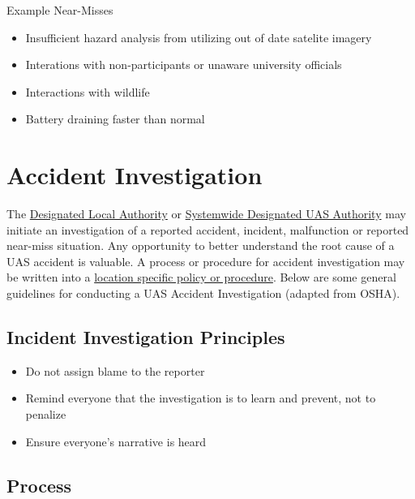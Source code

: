 \documentclass[
]{book}
\providecommand{\tightlist}{%
  \setlength{\itemsep}{0pt}\setlength{\parskip}{0pt}}
\begin{document}
Example Near-Misses

\begin{itemize}
\tightlist
\item
  Insufficient hazard analysis from utilizing out of date satelite imagery
\item
  Interations with non-participants or unaware university officials
\item
  Interactions with wildlife
\item
  Battery draining faster than normal
\end{itemize}

\hypertarget{s-investigation}{%
\section{Accident Investigation}\label{s-investigation}}

The \protect\hyperlink{DLA}{Designated Local Authority} or \protect\hyperlink{SDA}{Systemwide Designated UAS Authority} may initiate an investigation of a reported accident, incident, malfunction or reported near-miss situation. Any opportunity to better understand the root cause of a UAS accident is valuable. A process or procedure for accident investigation may be written into a \protect\hyperlink{LSP}{location specific policy or procedure}. Below are some general guidelines for conducting a UAS Accident Investigation (adapted from OSHA).

\hypertarget{incident-investigation-principles}{%
\subsection{Incident Investigation Principles}\label{incident-investigation-principles}}

\begin{itemize}
\tightlist
\item
  Do not assign blame to the reporter
\item
  Remind everyone that the investigation is to learn and prevent, not to penalize
\item
  Ensure everyone's narrative is heard
\end{itemize}

\hypertarget{process}{%
\subsection{Process}\label{process}}
\end{document}
